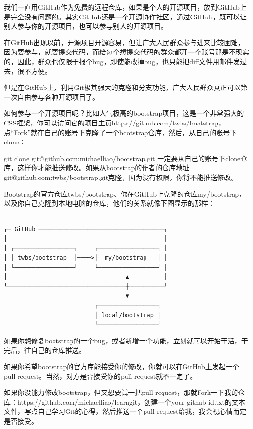 我们一直用GitHub作为免费的远程仓库，如果是个人的开源项目，放到GitHub上是完全没有问题的。其实GitHub还是一个开源协作社区，通过GitHub，既可以让别人参与你的开源项目，也可以参与别人的开源项目。

在GitHub出现以前，开源项目开源容易，但让广大人民群众参与进来比较困难，因为要参与，就要提交代码，而给每个想提交代码的群众都开一个账号那是不现实的，因此，群众也仅限于报个bug，即使能改掉bug，也只能把diff文件用邮件发过去，很不方便。

但是在GitHub上，利用Git极其强大的克隆和分支功能，广大人民群众真正可以第一次自由参与各种开源项目了。

如何参与一个开源项目呢？比如人气极高的bootstrap项目，这是一个非常强大的CSS框架，你可以访问它的项目主页https://github.com/twbs/bootstrap，点“Fork”就在自己的账号下克隆了一个bootstrap仓库，然后，从自己的账号下clone：

git clone git@github.com:michaelliao/bootstrap.git
一定要从自己的账号下clone仓库，这样你才能推送修改。如果从bootstrap的作者的仓库地址git@github.com:twbs/bootstrap.git克隆，因为没有权限，你将不能推送修改。

Bootstrap的官方仓库twbs/bootstrap、你在GitHub上克隆的仓库my/bootstrap，以及你自己克隆到本地电脑的仓库，他们的关系就像下图显示的那样：
\begin{verbatim}

┌─ GitHub ────────────────────────────────────┐
│                                             │
│ ┌─────────────────┐     ┌─────────────────┐ │
│ │ twbs/bootstrap  │────>│  my/bootstrap   │ │
│ └─────────────────┘     └─────────────────┘ │
│                                  ▲          │
└──────────────────────────────────┼──────────┘
                                   ▼
                          ┌─────────────────┐
                          │ local/bootstrap │
                          └─────────────────┘
\end{verbatim}

如果你想修复bootstrap的一个bug，或者新增一个功能，立刻就可以开始干活，干完后，往自己的仓库推送。

如果你希望bootstrap的官方库能接受你的修改，你就可以在GitHub上发起一个pull request。当然，对方是否接受你的pull request就不一定了。

如果你没能力修改bootstrap，但又想要试一把pull request，那就Fork一下我的仓库：https://github.com/michaelliao/learngit，创建一个your-github-id.txt的文本文件，写点自己学习Git的心得，然后推送一个pull request给我，我会视心情而定是否接受。

